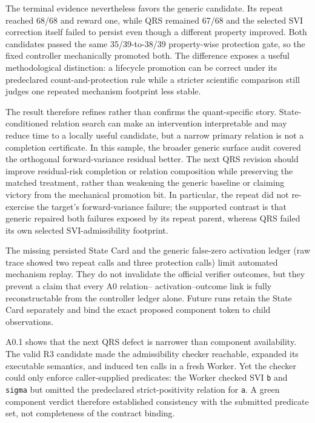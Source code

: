The terminal evidence nevertheless favors the generic candidate. Its repeat
reached 68/68 and reward one, while QRS remained 67/68 and the selected SVI
correction itself failed to persist even though a different property improved. Both
candidates passed the same 35/39-to-38/39 property-wise protection gate, so the
fixed controller mechanically promoted both. The difference exposes a useful
methodological distinction: a lifecycle promotion can be correct under its
predeclared count-and-protection rule while a stricter scientific comparison
still judges one repeated mechanism footprint less stable.

The result therefore refines rather than confirms the quant-specific story.
State-conditioned relation search can make an intervention interpretable and
may reduce time to a locally useful candidate, but a narrow primary relation is
not a completion certificate. In this sample, the broader generic surface audit
covered the orthogonal forward-variance residual better. The next QRS revision
should improve residual-risk completion or relation composition while
preserving the matched treatment, rather than weakening the generic baseline or
claiming victory from the mechanical promotion bit. In particular, the repeat
did not re-exercise the target's forward-variance failure; the supported
contrast is that generic repaired both failures exposed by its repeat parent,
whereas QRS failed its own selected SVI-admissibility footprint.

The missing persisted State Card and the generic false-zero activation ledger
(raw trace showed two repeat calls and three protection calls) limit automated
mechanism replay. They do not invalidate the
official verifier outcomes, but they prevent a claim that every A0 relation--
activation--outcome link is fully reconstructable from the controller ledger
alone. Future runs retain the State Card separately and bind the exact proposed
component token to child observations.


A0.1 shows that the next QRS defect is narrower than component availability.
The valid R3 candidate made the admissibility checker reachable, expanded its
executable semantics, and induced ten calls in a fresh Worker. Yet the checker
could only enforce caller-supplied predicates: the Worker checked SVI
\texttt{b} and \texttt{sigma} but omitted the predeclared strict-positivity
relation for \texttt{a}. A green component verdict therefore established
consistency with the submitted predicate set, not completeness of the contract
binding.

